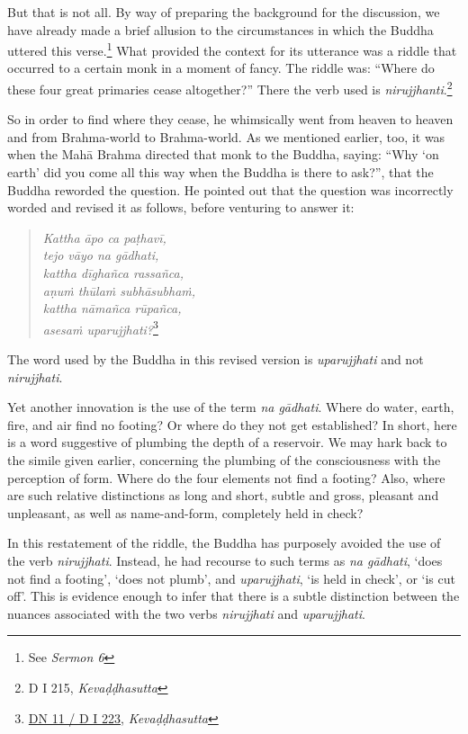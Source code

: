 But that is not all. By way of preparing the background for the discussion, we have already made a brief allusion to the circumstances in which the Buddha uttered this verse.\footnote{See \emph{Sermon 6}} What provided the context for its utterance was a riddle that occurred to a certain monk in a moment of fancy. The riddle was: ``Where do these four great primaries cease altogether?'' There the verb used is \emph{nirujjhanti}.\footnote{D I 215, \emph{Kevaḍḍhasutta}}

So in order to find where they cease, he whimsically went from heaven to heaven and from Brahma-world to Brahma-world. As we mentioned earlier, too, it was when the Mahā Brahma directed that monk to the Buddha, saying: ``Why `on earth' did you come all this way when the Buddha is there to ask?'', that the Buddha reworded the question. He pointed out that the question was incorrectly worded and revised it as follows, before venturing to answer it:

\clearpage

\begin{quote}
\emph{Kattha āpo ca paṭhavī,}\\
\emph{tejo vāyo na gādhati,}\\
\emph{kattha dīghañca rassañca,}\\
\emph{aṇuṁ thūlaṁ subhāsubhaṁ,}\\
\emph{kattha nāmañca rūpañca,}\\
\emph{asesaṁ uparujjhati?}\footnote{\href{https://suttacentral.net/dn11/pli/ms}{DN 11 / D I 223}, \emph{Kevaḍḍhasutta}}
\end{quote}

The word used by the Buddha in this revised version is \emph{uparujjhati} and not \emph{nirujjhati}.

Yet another innovation is the use of the term \emph{na gādhati}. Where do water, earth, fire, and air find no footing? Or where do they not get established? In short, here is a word suggestive of plumbing the depth of a reservoir. We may hark back to the simile given earlier, concerning the plumbing of the consciousness with the perception of form. Where do the four elements not find a footing? Also, where are such relative distinctions as long and short, subtle and gross, pleasant and unpleasant, as well as name-and-form, completely held in check?

In this restatement of the riddle, the Buddha has purposely avoided the use of the verb \emph{nirujjhati}. Instead, he had recourse to such terms as \emph{na gādhati}, `does not find a footing', `does not plumb', and \emph{uparujjhati}, `is held in check', or `is cut off'. This is evidence enough to infer that there is a subtle distinction between the nuances associated with the two verbs \emph{nirujjhati} and \emph{uparujjhati}.

